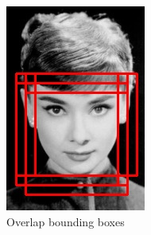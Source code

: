 \begin{figure}[!h]
	\centering
	\begin{subfigure}{.13\linewidth}
		\includegraphics[width=1\linewidth]{images/detection/img1_noNMS}
		\caption{Overlap bounding boxes }
		\label{fig:sub_noNMS}
	\end{subfigure}
	\begin{subfigure}{.13\linewidth}

\end{subfigure}
\end{figure}
